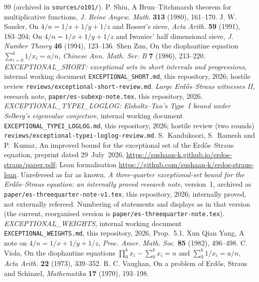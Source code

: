 \documentclass[10pt,reqno]{amsart}
\theoremstyle{definition}
\begin{document}
\begin{thebibliography}{99}
(archived in \texttt{sources/o101/}).
P. Shiu, A Brun--Titchmarsh theorem for multiplicative functions,
\emph{J. Reine Angew. Math.} \textbf{313} (1980), 161--170.
J. W. Sander, On $4/n=1/x+1/y+1/z$ and Rosser's sieve, \emph{Acta
Arith.} \textbf{59} (1991), 183--204; On $4/n=1/x+1/y+1/z$ and
Iwaniec' half dimensional sieve, \emph{J. Number Theory} \textbf{46}
(1994), 123--136.
Shen Zun, On the diophantine equation $\sum_{i=0}^k1/x_i=a/n$,
\emph{Chinese Ann. Math. Ser. B} \textbf{7} (1986), 213--220.
\emph{EXCEPTIONAL\_SHORT: exceptional sets in short intervals and
progressions}, internal working document \texttt{EXCEPTIONAL\_SHORT.md},
this repository, 2026; hostile review
\texttt{reviews/exceptional-short-review.md}.
\emph{Large Erd\H{o}s--Straus witnesses II}, research note,
\texttt{paper/es-subexp-note.tex}, this repository, 2026.
\emph{EXCEPTIONAL\_TYPEI\_LOGLOG: Elsholtz--Tao's Type~I bound under
Selberg's eigenvalue conjecture}, internal working document
\texttt{EXCEPTIONAL\_TYPEI\_LOGLOG.md}, this repository, 2026; hostile
review (two rounds) \texttt{reviews/exceptional-typei-loglog-review.md}.
S.~Kandukoori, S.~Ramesh and P.~Kumar, An improved bound for the
exceptional set of the Erd\H{o}s--Straus equation, preprint dated
29~July~2026, \url{https://sushaan-k.github.io/erdos-straus/paper.pdf};
Lean formalisation \url{https://github.com/sushaan-k/erdos-straus-lean}.
Unrefereed as far as known.
\emph{A three-quarter exceptional-set bound for the Erd\H{o}s--Straus
equation: an internally proved research note},
version~1, archived as \texttt{paper/es-threequarter-note-v1.tex}, this
repository, 2026; internally proved, not externally refereed.  Numbering
of statements and displays as in that version (the current, reorganised
version is \texttt{paper/es-threequarter-note.tex}).
\emph{EXCEPTIONAL\_WEIGHTS}, internal working document
\texttt{EXCEPTIONAL\_WEIGHTS.md}, this repository, 2026, Prop.~5.1.
Xun Qian Yang, A note on $4/n=1/x+1/y+1/z$, \emph{Proc. Amer. Math. Soc.}
\textbf{85} (1982), 496--498.
C. Viola, On the diophantine equations $\prod_0^kx_i-\sum_0^kx_i=n$ and
$\sum_0^k1/x_i=a/n$, \emph{Acta Arith.} \textbf{22} (1973), 339--352.
R. C. Vaughan, On a problem of Erd\H{o}s, Straus and Schinzel,
\emph{Mathematika} \textbf{17} (1970), 193--198.
\end{thebibliography}
\end{document}
